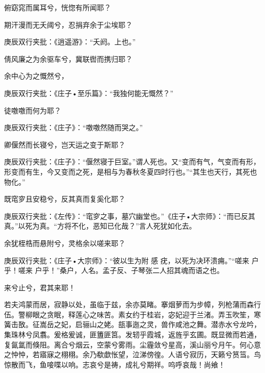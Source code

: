 \begin{poem}
\begin{pl}
        俯窈窕而属耳兮，恍惚有所闻耶？
    \end{pl}
    \begin{pl}

        期汗漫而无夭阈兮，忍捐弃余于尘埃耶？\begin{note}庚辰双行夹批：《逍遥游》：“夭阏。上也。”\end{note}
    \end{pl}
    \begin{pl}

        倩风廉之为余驱车兮，冀联辔而携归耶？
    \end{pl}
    \begin{pl}

        余中心为之慨然兮，\begin{note}庚辰双行夹批：《庄子•至乐篇》：“我独何能无慨然？”\end{note}徒噭噭而何为耶？\begin{note}庚辰双行夹批：《庄子》：“噭噭然随而哭之。”\end{note}
    \end{pl}
    \begin{pl}

        卿偃然而长寝兮，岂天运之变于斯耶？\begin{note}庚辰双行夹批：《庄子》：“偃然寝于巨室。”谓人死也。又“变而有气，气变而有形，形变而有生，今又变而之死，是相与为春秋冬夏四时行也。”“其生也天行，其死也物化。”\end{note}
    \end{pl}
    \begin{pl}

        既窀穸且安稳兮，反其真而复奚化耶？\begin{note}庚辰双行夹批：《左传》：“窀穸之事，墓穴幽堂也。”《庄子•大宗师》：“而已反其真。”以死为真。“方将不化，恶知已化哉？”言人死犹如化去。\end{note}
    \end{pl}
    \begin{pl}

        余犹桎梏而悬附兮，灵格余以嗟来耶？\begin{note}庚辰双行夹批：《庄子•大宗师》：“彼以生为附 感 疣，以死为决环溃痈。”“嗟来 户乎！嗟来 户乎！”桑户，人名。孟子反、子琴张二人招其魂而语之也。\end{note}
    \end{pl}
    \begin{pl}

        来兮止兮，君其来耶！
    \end{pl}
    \begin{pl}

        若夫鸿蒙而居，寂静以处，虽临于兹，余亦莫睹。搴烟萝而为步幛，列枪蒲而森行伍。警柳眼之贪眠，释莲心之味苦。素女约于桂岩，宓妃迎于兰渚。弄玉吹笙，寒簧击敔。征嵩岳之妃，启骊山之姥。瓿事迤之灵，兽作咸池之舞。潜赤水兮龙吟，集珠林兮凤翥。爰格爰诚，匪簠匪筥。发轫乎霞城，返旌乎玄圃。既显微而若通，复氤氲而倏阻。离合兮烟云，空蒙兮雾雨。尘霾敛兮星高，溪山丽兮月午。何心意之忡忡，若寤寐之栩栩。余乃欷歔怅望，泣涕傍徨。人语兮寂历，天籁兮筼筜。鸟惊散而飞，鱼唼喋以响。志哀兮是祷，成礼兮期祥。呜呼哀哉！尚飨！
    \end{pl}
\end{poem}


